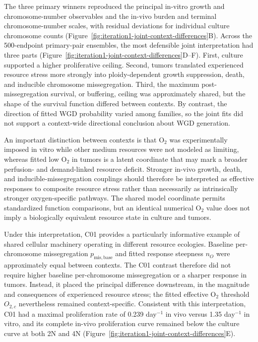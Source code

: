 \documentclass[11pt]{article}
\begin{document}
The three primary winners reproduced the principal in-vitro growth and chromosome-number observables and the in-vivo burden and terminal chromosome-number scales, with residual deviations for individual culture chromosome counts (Figure~\ref{fig:iteration1-joint-context-differences}B). Across the 500-endpoint primary-pair ensembles, the most defensible joint interpretation had three parts (Figure~\ref{fig:iteration1-joint-context-differences}D--F). First, culture supported a higher proliferative ceiling. Second, tumors translated experienced resource stress more strongly into ploidy-dependent growth suppression, death, and inducible chromosome missegregation. Third, the maximum post-missegregation survival, or buffering, ceiling was approximately shared, but the shape of the survival function differed between contexts. By contrast, the direction of fitted WGD probability varied among families, so the joint fits did not support a context-wide directional conclusion about WGD generation.

An important distinction between contexts is that O$_2$ was experimentally imposed in vitro while other medium resources were not modeled as limiting, whereas fitted low O$_2$ in tumors is a latent coordinate that may mark a broader perfusion- and demand-linked resource deficit. Stronger in-vivo growth, death, and inducible-missegregation couplings should therefore be interpreted as effective responses to composite resource stress rather than necessarily as intrinsically stronger oxygen-specific pathways. The shared model coordinate permits standardized function comparisons, but an identical numerical O$_2$ value does not imply a biologically equivalent resource state in culture and tumors.

Under this interpretation, C01 provides a particularly informative example of shared cellular machinery operating in different resource ecologies. Baseline per-chromosome missegregation \(p_{\mathrm{mis,base}}\) and fitted response steepness \(n_O\) were approximately equal between contexts. The C01 contrast therefore did not require higher baseline per-chromosome missegregation or a sharper response in tumors. Instead, it placed the principal difference downstream, in the magnitude and consequences of experienced resource stress; the fitted effective O$_2$ threshold \(O_{2,c}\) nevertheless remained context-specific. Consistent with this interpretation, C01 had a maximal proliferation rate of 0.239 day$^{-1}$ in vivo versus 1.35 day$^{-1}$ in vitro, and its complete in-vivo proliferation curve remained below the culture curve at both 2N and 4N (Figure~\ref{fig:iteration1-joint-context-differences}E).
\end{document}
